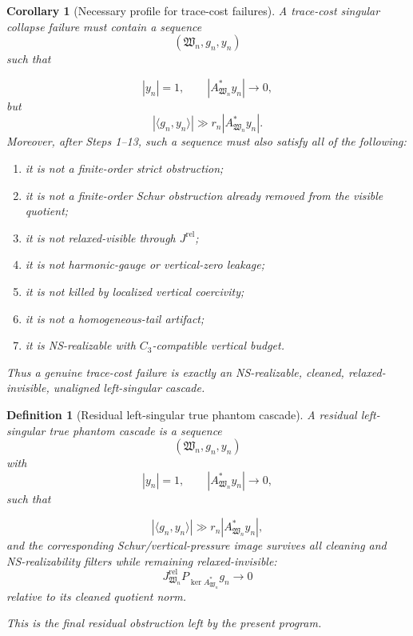 \documentclass[11pt]{article}
\numberwithin{equation}{section}
\newtheorem{corollary}[theorem]{Corollary}
\newtheorem{definition}[theorem]{Definition}
\begin{document}
\begin{corollary}[Necessary profile for trace-cost failures]
A trace-cost singular collapse failure must contain a sequence
\[
(\mathfrak W_n,g_n,y_n)
\]
such that

\[
|y_n|=1,
\qquad
|A_{\mathfrak W_n}^*y_n|\to0,
\]
but
\begin{equation}
|\langle g_n,y_n\rangle|
\gg
r_n|A_{\mathfrak W_n}^*y_n|.
\label{eq:tag-10-243}
\end{equation}
Moreover, after Steps 1--13, such a sequence must also satisfy all of the following:

\begin{enumerate}
\item it is not a finite-order strict obstruction;
\item it is not a finite-order Schur obstruction already removed from the visible quotient;
\item it is not relaxed-visible through \(J^{\mathrm{rel}}\);
\item it is not harmonic-gauge or vertical-zero leakage;
\item it is not killed by localized vertical coercivity;
\item it is not a homogeneous-tail artifact;
\item it is NS-realizable with \(C_3\)-compatible vertical budget.
\end{enumerate}

Thus a genuine trace-cost failure is exactly an NS-realizable, cleaned, relaxed-invisible, unaligned left-singular cascade.
\end{corollary}

\begin{definition}[Residual left-singular true phantom cascade]
A residual left-singular true phantom cascade is a sequence
\[
(\mathfrak W_n,g_n,y_n)
\]
with
\[
|y_n|=1,
\qquad
|A_{\mathfrak W_n}^*y_n|\to0,
\]
such that

\[
|\langle g_n,y_n\rangle|
\gg
r_n|A_{\mathfrak W_n}^*y_n|,
\]
and the corresponding Schur/vertical-pressure image survives all cleaning and NS-realizability filters while remaining relaxed-invisible:
\[
J_{\mathfrak W_n}^{\mathrm{rel}}P_{\ker A_{\mathfrak W_n}^*}g_n
\to0
\]
relative to its cleaned quotient norm.

This is the final residual obstruction left by the present program.
\end{definition}
\end{document}
